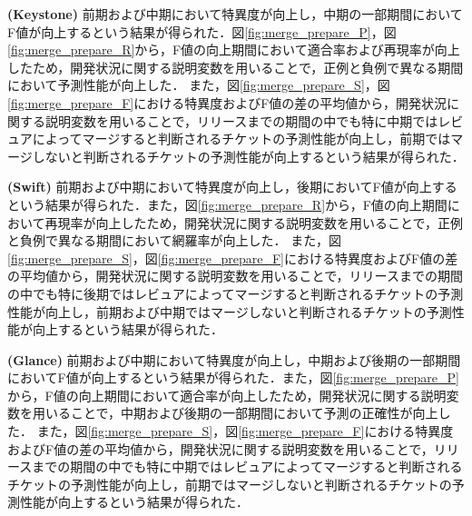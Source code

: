 \documentclass[submit]{ipsj}
\begin{document}
\textbf{ (Keystone) }前期および中期において特異度が向上し，中期の一部期間においてF値が向上するという結果が得られた．図\ref{fig:merge_prepare_P}，図\ref{fig:merge_prepare_R}から，F値の向上期間において適合率および再現率が向上したため，開発状況に関する説明変数を用いることで，正例と負例で異なる期間において予測性能が向上した．
また，図\ref{fig:merge_prepare_S}，図\ref{fig:merge_prepare_F}における特異度およびF値の差の平均値から，開発状況に関する説明変数を用いることで，リリースまでの期間の中でも特に中期ではレビュアによってマージすると判断されるチケットの予測性能が向上し，前期ではマージしないと判断されるチケットの予測性能が向上するという結果が得られた．

\textbf{ (Swift) }前期および中期において特異度が向上し，後期においてF値が向上するという結果が得られた．また，図\ref{fig:merge_prepare_R}から，F値の向上期間において再現率が向上したため，開発状況に関する説明変数を用いることで，正例と負例で異なる期間において網羅率が向上した．
また，図\ref{fig:merge_prepare_S}，図\ref{fig:merge_prepare_F}における特異度およびF値の差の平均値から，開発状況に関する説明変数を用いることで，リリースまでの期間の中でも特に後期ではレビュアによってマージすると判断されるチケットの予測性能が向上し，前期および中期ではマージしないと判断されるチケットの予測性能が向上するという結果が得られた．

\textbf{ (Glance) }前期および中期において特異度が向上し，中期および後期の一部期間においてF値が向上するという結果が得られた．また，図\ref{fig:merge_prepare_P}から，F値の向上期間において適合率が向上したため，開発状況に関する説明変数を用いることで，中期および後期の一部期間において予測の正確性が向上した．
また，図\ref{fig:merge_prepare_S}，図\ref{fig:merge_prepare_F}における特異度およびF値の差の平均値から，開発状況に関する説明変数を用いることで，リリースまでの期間の中でも特に中期ではレビュアによってマージすると判断されるチケットの予測性能が向上し，前期ではマージしないと判断されるチケットの予測性能が向上するという結果が得られた．
\end{document}
